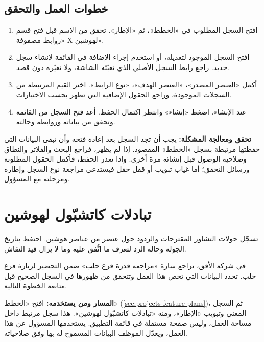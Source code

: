 \subsection{خطوات العمل والتحقق}
\begin{enumerate}
\item افتح السجل المطلوب في «الخطط»، ثم «الإطار». تحقق من الاسم قبل فتح قسم «روابط مصفوفة X لهوشين».
\item افتح السجل الموجود لتعديله، أو استخدم إجراء الإضافة في القائمة لإنشاء سجل جديد. راجع رابط السجل الأصلي الذي تعبّئه الشاشة، ولا تغيّره دون قصد.
\item أكمل «العنصر المصدر»، «العنصر الهدف»، «نوع الرابط». اختر القيم المرتبطة من السجلات الموجودة، وراجع الحقول الإضافية التي تظهر بحسب الاختيارات.
\item عند الإنشاء، اضغط «إنشاء» وانتظر اكتمال الحفظ. أعد فتح السجل من القائمة وتحقق من بياناته وروابطه وحالته.
\end{enumerate}

\textbf{تحقق ومعالجة المشكلة:} يجب أن تجد السجل بعد إعادة فتحه وأن تبقى البيانات التي حفظتها مرتبطة بسجل «الخطط» المقصود. إذا لم يظهر، فراجع البحث والفلاتر والنطاق وصلاحية الوصول قبل إنشائه مرة أخرى. وإذا تعذر الحفظ، فأكمل الحقول المطلوبة ورسائل التحقق؛ أما غياب تبويب أو قفل حقل فيستدعي مراجعة نوع السجل وإطاره ومرحلته مع المسؤول.

\clearpage
\section{تبادلات كاتشبّول لهوشين}
\label{sec:projects-feature-planning-hoshin-catchball-exchanges}

تسجّل جولات التشاور المقترحات والردود حول عنصر من عناصر هوشين. احتفظ بتاريخ الجولة وحالة الرد لتعرف ما اتُّفق عليه وما لا يزال قيد النقاش.

\begin{rcnote}
في شركة الأفق، تراجع سارة «مراجعة قدرة فرع حلب» ضمن التحضير لزيارة فرع حلب. تحدد البيانات التي تخص هذا العمل وتتحقق من ظهورها في السجل الصحيح قبل متابعة الخطوة التالية.
\end{rcnote}

\textbf{المسار ومن يستخدمه:} افتح «الخطط» (\ref{sec:projects-feature-plans})، ثم السجل المعني وتبويب «الإطار»، ومنه «تبادلات كاتشبّول لهوشين». هذا سجل مرتبط داخل مساحة العمل، وليس صفحة مستقلة في قائمة التطبيق. يستخدمها المسؤول عن هذا العمل، ويعدّل الموظف البيانات المسموح له بها وفق صلاحياته.

